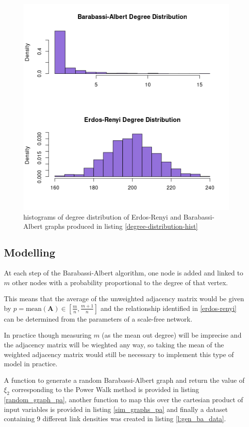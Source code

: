 \documentclass[11pt]{article}
\begin{document}
\begin{figure}[htbp]
\centering
\includegraphics[width=12cm]{media/degree_dist_er_ba.png}
\caption{\label{fig:degree-distribution-hist}histograms of degree distribution of Erdos-Renyi and Barabassi-Albert graphs produced in listing \ref{degree-distribution-hist}}
\end{figure}

\subsection{Modelling}
\label{sec:orgb52cc3e}
At each step of the Barabassi-Albert algorithm, one node is added and linked to \(m\) other nodes with a probability proportional to the degree of that vertex.

This means that the average of the unweighted adjacency matrix would be given by \(p = \mathrm{mean}\left(\mathbf{A}\right) \in \left[ \frac{m}{n}, \frac{m+1}{n} \right]\) and the relationship identified in \ref{erdos-renyi} can be determined from the parameters of a scale-free network.

In practice though measuring \(m\) (as the mean out degree) will be imprecise and the adjacency matrix will be wieghted any way, so taking the mean of the weighted adjacency matrix would still be necessary to implement this type of model in practice.

A function to generate a random Barabassi-Albert graph and return the value of
\(\xi_{2}\) corresponding to the Power Walk method is provided in listing
\ref{random_graph_pa}, another function to map this over the cartesian product of
input variables is provided in listing \ref{sim_graphs_pa} and finally a dataset containing 9
different link densities was created in listing \ref{l:gen_ba_data}.
\end{document}
